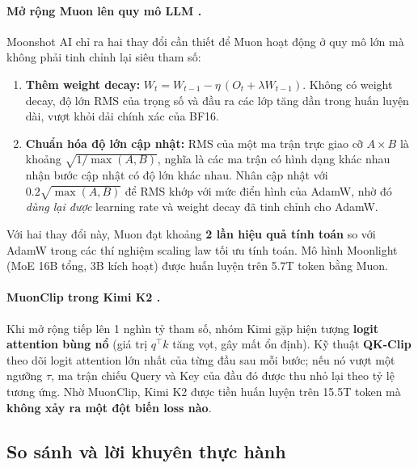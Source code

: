 \paragraph{Mở rộng Muon lên quy mô LLM \cite{liu2025muon}.} Moonshot AI chỉ ra hai thay đổi cần thiết để Muon hoạt động ở quy mô lớn mà không phải tinh chỉnh lại siêu tham số:
\begin{enumerate}
	\item \textbf{Thêm weight decay:} $W_t = W_{t-1} - \eta\,(O_t + \lambda W_{t-1})$. Không có weight decay, độ lớn RMS của trọng số và đầu ra các lớp tăng dần trong huấn luyện dài, vượt khỏi dải chính xác của BF16.
	\item \textbf{Chuẩn hóa độ lớn cập nhật:} RMS của một ma trận trực giao cỡ $A\times B$ là khoảng $\sqrt{1/\max(A,B)}$, nghĩa là các ma trận có hình dạng khác nhau nhận bước cập nhật có độ lớn khác nhau. Nhân cập nhật với $0.2\sqrt{\max(A,B)}$ để RMS khớp với mức điển hình của AdamW, nhờ đó \emph{dùng lại được} learning rate và weight decay đã tinh chỉnh cho AdamW.
\end{enumerate}
Với hai thay đổi này, Muon đạt khoảng \textbf{2 lần hiệu quả tính toán} so với AdamW trong các thí nghiệm scaling law tối ưu tính toán. Mô hình Moonlight (MoE 16B tổng, 3B kích hoạt) được huấn luyện trên 5.7T token bằng Muon.

\paragraph{MuonClip trong Kimi K2 \cite{kimiteam2025k2}.} Khi mở rộng tiếp lên 1 nghìn tỷ tham số, nhóm Kimi gặp hiện tượng \textbf{logit attention bùng nổ} (giá trị $q^\top k$ tăng vọt, gây mất ổn định). Kỹ thuật \textbf{QK-Clip} theo dõi logit attention lớn nhất của từng đầu sau mỗi bước; nếu nó vượt một ngưỡng $\tau$, ma trận chiếu Query và Key của đầu đó được thu nhỏ lại theo tỷ lệ tương ứng. Nhờ MuonClip, Kimi K2 được tiền huấn luyện trên 15.5T token mà \textbf{không xảy ra một đột biến loss nào}.

\subsection{So sánh và lời khuyên thực hành}
\label{ssec:optimizer_comparison}

